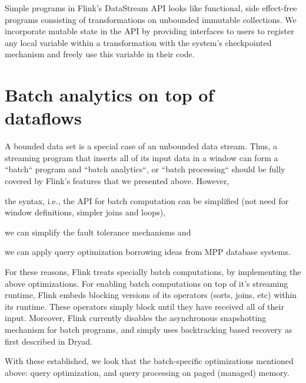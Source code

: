 \documentclass{sig-alternate}
\begin{document}
Simple programs in Flink's DataStream API looks like functional, side effect-free programs consisting of transformations on unbounded immutable collections. We incorporate mutable state in the API by providing interfaces to users to register any local variable within a transformation with the system's checkpointed mechanism and freely use this variable in their code. 


\section{Batch analytics on top of \\ dataflows}

A bounded data set is a special case of an unbounded data stream. Thus, a streaming program that inserts all of its input data in a window can form a ``batch`` program and ``batch analytics``, or ``batch processing`` should be fully covered by Flink's features that we presented above. However, \begin{inparaenum}[i)]
  \item the syntax, i.e., the API for batch computation can be simplified (not need for window definitions, simpler joins and loops),
  \item we can simplify the fault tolerance mechanisms and
  \item we can apply query optimization borrowing ideas from MPP database systems.
\end{inparaenum}
For these reasons, Flink treats specially batch computations, by implementing the above optimizations. For enabling batch computations on top of it's streaming runtime, Flink embeds blocking versions of its operators (sorts, joins, etc) within its runtime. These operators simply block until they have received all of their input. Moreover, Flink currently disables the asynchronous snapshotting mechanism for batch programs, and simply uses backtracking based recovery as first described in Dryad.~\cite{isard2007dryad}

With these established, we look that the batch-specific optimizations mentioned above: query optimization, and query processing on paged (managed) memory.
\end{document}
